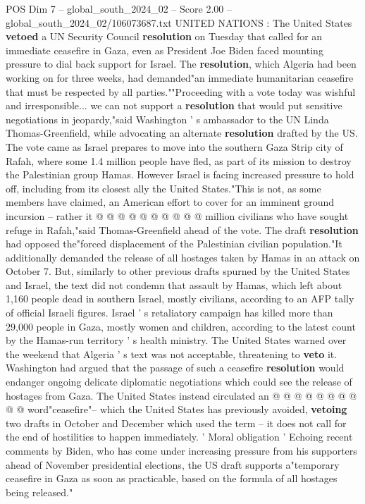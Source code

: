 \begin{textsample}{POS Dim 7 – global\_south\_2024\_02 – Score 2.00 – global\_south\_2024\_02/106073687.txt}  \label{ex:f7_pos_052}
UNITED NATIONS : The United States \textbf{vetoed} a UN Security Council \textbf{resolution} on Tuesday that called for an immediate ceasefire in Gaza, even as President Joe Biden faced mounting pressure to dial back support for Israel.
The \textbf{resolution}, which Algeria had been working on for three weeks, had demanded"an immediate humanitarian ceasefire that must be respected by all parties.""Proceeding with a vote today was wishful and irresponsible... we can not support a \textbf{resolution} that would put sensitive negotiations in jeopardy,"said Washington ' s ambassador to the UN Linda Thomas-Greenfield, while advocating an alternate \textbf{resolution} drafted by the US.
The vote came as Israel prepares to move into the southern Gaza Strip city of Rafah, where some 1.4 million people have fled, as part of its mission to destroy the Palestinian group Hamas.
However Israel is facing increased pressure to hold off, including from its closest ally the United States."This is not, as some members have claimed, an American effort to cover for an imminent ground incursion -- rather it @ @ @ @ @ @ @ @ @ @ million civilians who have sought refuge in Rafah,"said Thomas-Greenfield ahead of the vote.
The draft \textbf{resolution} had opposed the"forced displacement of the Palestinian civilian population."It additionally demanded the release of all hostages taken by Hamas in an attack on October 7.
But, similarly to other previous drafts spurned by the United States and Israel, the text did not condemn that assault by Hamas, which left about 1,160 people dead in southern Israel, mostly civilians, according to an AFP tally of official Israeli figures.
Israel ' s retaliatory campaign has killed more than 29,000 people in Gaza, mostly women and children, according to the latest count by the Hamas-run territory ' s health ministry.
The United States warned over the weekend that Algeria ' s text was not acceptable, threatening to \textbf{veto} it.
Washington had argued that the passage of such a ceasefire \textbf{resolution} would endanger ongoing delicate diplomatic negotiations which could see the release of hostages from Gaza.
The United States instead circulated an @ @ @ @ @ @ @ @ @ @ word"ceasefire"-- which the United States has previously avoided, \textbf{vetoing} two drafts in October and December which used the term -- it does not call for the end of hostilities to happen immediately. ' Moral obligation ' Echoing recent comments by Biden, who has come under increasing pressure from his supporters ahead of November presidential elections, the US draft supports a"temporary ceasefire in Gaza as soon as practicable, based on the formula of all hostages being released."

\end{textsample}

